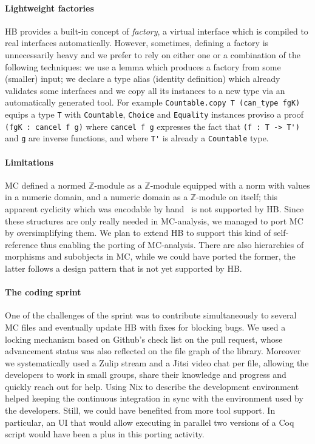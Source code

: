 \documentclass{easychair}
\def\MC{{\sf MC}}
\def\HB{{\sf HB}}
\def\newterm#1{{\it #1}}
\begin{document}
\paragraph{Lightweight factories}

\HB{} provides a built-in concept of \newterm{factory}, a virtual interface which is
compiled to real interfaces automatically. %
However, sometimes, defining a factory is
unnecessarily heavy and we prefer to rely on either one or a combination of the
following techniques: we use a lemma which produces a
factory from some (smaller) input; we declare a type alias (identity definition)
which already validates some interfaces and we copy all its instances to a new
type via an automatically generated tool. For example
\verb+Countable.copy T (can_type fgK)+ equips a type \verb+T+ with
\verb+Countable+, \verb+Choice+ and \verb+Equality+ instances proviso a
proof \verb+(fgK : cancel f g)+ where \verb+cancel f g+ expresses the fact
that \verb+(f : T -> T')+ and \verb+g+ are inverse functions, and where \verb+T'+
is already a \verb+Countable+ type.

\paragraph{Limitations}

\MC{} defined a normed $\mathbb{Z}$-module as a
$\mathbb{Z}$-module equipped with a norm with values in a numeric domain,
and a numeric domain as a $\mathbb{Z}$-module on itself; this apparent
cyclicity which was encodable by hand~\cite{affeldt:hal-02463336}
is not supported by \HB{}.
Since these structures are only really needed in \MC{}-analysis,
we managed to port \MC{} by oversimplifying them.
We plan to extend \HB{} to support this kind of self-reference
thus enabling the porting of \MC{}-analysis. There are also hierarchies of
morphisms and subobjects in \MC{}, while we could have ported the former,
the latter follows a design pattern that is not yet
supported by \HB{}.

\paragraph{The coding sprint}

One of the challenges of the sprint was to contribute simultaneously
to several \MC{} files and eventually update \HB{} with fixes for blocking bugs.
We used a locking mechanism based on Github's check list on the pull request,
whose advancement status was also reflected on the file graph of the library.
Moreover we systematically used a Zulip stream and a Jitsi video chat per file,
allowing the developers to work in small groups,
share their knowledge and progress and quickly reach out for help. Using Nix to describe the development
environment helped keeping the continuous integration in sync with the
environment used by the developers.
Still, we could have benefited from more tool support. In particular,
an UI that would allow executing in parallel two versions of a Coq script
would have been a plus in this porting activity.
\end{document}
